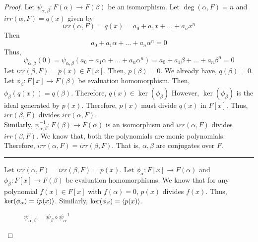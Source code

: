 \begin{proof} 
	Let $\psi_{\alpha,\beta} : F(\alpha) \to F(\beta)$ be an isomorphism.
	Let $\deg(\alpha,F) = n$ and $irr(\alpha,F) = q(x)$ given by
	\[ irr(\alpha,F) = q(x) = a_0 + a_1 x + \dots + a_n x^n \]
	Then 
	\[ a_0 + a_1 \alpha + \dots + a_n \alpha^n = 0 \]
	Thus,
	\[ \psi_{\alpha,\beta}(0) = \psi_{\alpha,\beta} (a_0 + a_1 \alpha + \dots + a_n \alpha^n) = a_0 + a_1 \beta + \dots + a_n \beta^n = 0 \]
	Let $irr(\beta,F) = p(x) \in F[x]$.
	Then, $p(\beta) = 0$.
	We already have, $q(\beta) = 0$.
	Let $\phi_\beta : F[x] \to F(\beta)$ be evaluation homomorphism.
	Then, $\phi_\beta(q(x)) = q(\beta)$.
	Therefore, $q(x) \in \ker(\phi_\beta)$
	However, $\ker(\phi_\beta)$ is the ideal generated by $p(x)$.
	Therefore, $p(x)$ must divide $q(x)$ in $F[x]$.
	Thus, $irr(\beta,F)$ divides $irr(\alpha,F)$.\\

	Similarly, $\psi_{\alpha,\beta}^{-1} : F(\beta) \to F(\alpha)$ is an isomorphism and $irr(\alpha,F)$ divides $irr(\beta,F)$.
	We know that, both the polynomials are monic polynomials.
	Therefore, $irr(\alpha,F) = irr(\beta,F)$.
	That is, $\alpha,\beta$ are conjugates over $F$.\\

	\hrule\vspace{1em}

	Let $irr(\alpha,F) = irr(\beta,F) = p(x)$.
	Let $\phi_\alpha : F[x] \to F(\alpha)$ and $\phi_\beta : F[x] \to F(\beta)$ be evaluation homomorphisms.
	We know that for any polynomial $f(x) \in F[x]$ with $f(\alpha) = 0$, $p(x)$ divides $f(x)$.
	Thus, $\ker(\phi_\alpha) = \langle p(x)\rangle$.
	Similarly, $\ker(\phi_\beta) = \langle p(x)\rangle$.\\

\begin{figure}[h]
	\centering
	\caption{$\psi_{\alpha,\beta} = \psi_\beta \circ \psi_\alpha^{-1}$}
\end{figure}


\end{proof}
